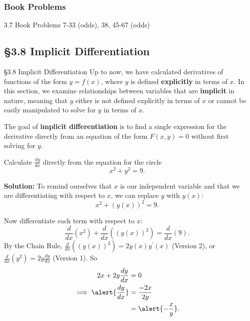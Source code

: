 \documentclass[cal1spr16Lectures.tex]{subfiles}
\begin{document}
\subsubsection{Book Problems}

\begin{frame}
\begin{block}{3.7 Book Problems} 7-33 (odds), 38, 45-67 (odds) \end{block} 
\end{frame}

\subsection[3.8 Implicit Differentiation]{\S 3.8 Implicit Differentiation}

\begin{frame}{\S 3.8 Implicit Differentiation}\footnotesize
Up to now, we have calculated derivatives of functions of the form $y=f(x)$, where $y$ is defined {\bf explicitly} in terms of $x$.  In this section, we examine relationships between variables that are {\bf implicit} in nature, meaning that $y$ either is not defined explicitly in terms of $x$ or cannot be easily manipulated to solve for $y$ in terms of $x$.

\vspace{1pc}
The goal of {\bf implicit differentiation} is to find a single expression for the derivative directly from an equation of the form $F(x,y)=0$ without first solving for $y$.
\end{frame}

\begin{frame}{}
\begin{ex} Calculate $\textstyle\frac{dy}{dx}$ directly from the equation for the circle 
\[x^2 + y^2 = 9.\]
\end{ex}
{\bf Solution:}  To remind ourselves that $x$ is our independent variable and that we are differentiating with respect to $x$, we can replace $y$ with $y(x)$:
\[x^2 + (y(x))^2 = 9.\]
\end{frame}

\begin{frame}\footnotesize
Now differentiate each term with respect to $x$:
\[\frac{d}{dx} (x^2) + \frac{d}{dx} ((y(x))^2) = \frac{d}{dx}(9).\]
By the Chain Rule, $\textstyle\frac{d}{dx}((y(x))^2)=2y(x) y^{\prime}(x)$ (Version 2), or $\textstyle\frac{d}{dx}(y^2)=2y \frac{dy}{dx}$ (Version 1).  So 
\begin{align*}
2x+2y \frac{dy}{dx} &= 0 \\
\implies \alert{\frac{dy}{dx}} &= \frac{-2x}{2y} \\
	&= \alert{-\frac{x}{y}}.
\end{align*}
\end{frame}
\end{document}
